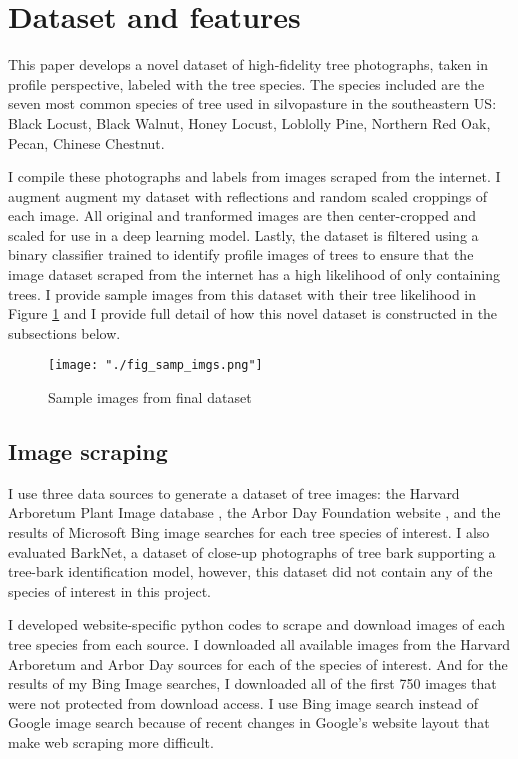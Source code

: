 \documentclass[10pt,twocolumn,letterpaper]{article}
\begin{document}
\section{Dataset and features}
\label{sec:data}
This paper develops a novel dataset of high-fidelity tree photographs, taken in profile perspective, labeled with the tree species. The species included are the seven most common species of tree used in silvopasture in the southeastern US: Black Locust, Black Walnut, Honey Locust, Loblolly Pine, Northern Red Oak, Pecan, Chinese Chestnut. 

I compile these photographs and labels from images scraped from the internet. I augment augment my dataset with reflections and random scaled croppings of each image. All original and tranformed images are then center-cropped and scaled for use in a deep learning model. Lastly, the dataset is filtered using a binary classifier trained to identify profile images of trees to ensure that the image dataset scraped from the internet has a high likelihood of only containing trees. I provide sample images from this dataset with their tree likelihood in Figure \ref{fig:samp_imgs} and I provide full detail of how this novel dataset is constructed in the subsections below.

\begin{figure}[!htbp]
  \centering
  \texttt{[image: "./fig\_samp\_imgs.png"]}
  \caption{\label{fig:samp_imgs} Sample images from final dataset}
\end{figure}

\subsection{Image scraping}

I use three data sources to generate a dataset of tree images: the Harvard Arboretum Plant Image database \cite{harvard}, the Arbor Day Foundation website \cite{arborday}, and the results of Microsoft Bing image searches for each tree species of interest. I also evaluated BarkNet, a dataset of close-up photographs of tree bark supporting a tree-bark identification model, however, this dataset did not contain any of the species of interest in this project.

I developed website-specific python codes to scrape and download images of each tree species from each source. I downloaded all available images from the Harvard Arboretum and Arbor Day sources for each of the species of interest. And for the results of my Bing Image searches, I downloaded all of the first 750 images that were not protected from download access. I use Bing image search instead of Google image search because of recent changes in Google's website layout that make web scraping more difficult.
\end{document}
